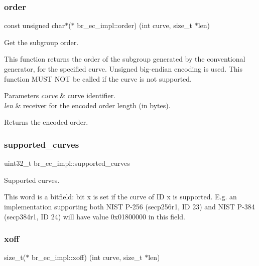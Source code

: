 \subsubsection{\texorpdfstring{order}{order}}
{\footnotesize\ttfamily const unsigned char$\ast$($\ast$ br\+\_\+ec\+\_\+impl\+::order) (int curve, size\+\_\+t $\ast$len)}



Get the subgroup order. 

This function returns the order of the subgroup generated by the conventional generator, for the specified curve. Unsigned big-\/endian encoding is used. This function M\+U\+ST N\+OT be called if the curve is not supported.


\begin{DoxyParams}{Parameters}
{\em curve} & curve identifier. \\
\hline
{\em len} & receiver for the encoded order length (in bytes). \\
\hline
\end{DoxyParams}
\begin{DoxyReturn}{Returns}
the encoded order. 
\end{DoxyReturn}
\mbox{\label{structbr__ec__impl_ab69ca9dac77a15e383b4f87aa9bca444}} 
\subsubsection{\texorpdfstring{supported\+\_\+curves}{supported\_curves}}
{\footnotesize\ttfamily uint32\+\_\+t br\+\_\+ec\+\_\+impl\+::supported\+\_\+curves}



Supported curves. 

This word is a bitfield\+: bit {\ttfamily x} is set if the curve of ID {\ttfamily x} is supported. E.\+g. an implementation supporting both N\+I\+ST P-\/256 (secp256r1, ID 23) and N\+I\+ST P-\/384 (secp384r1, ID 24) will have value {\ttfamily 0x01800000} in this field. \mbox{\label{structbr__ec__impl_a8b786258f39d2d26e03e96dec95a6d23}} 
\subsubsection{\texorpdfstring{xoff}{xoff}}
{\footnotesize\ttfamily size\+\_\+t($\ast$ br\+\_\+ec\+\_\+impl\+::xoff) (int curve, size\+\_\+t $\ast$len)}




